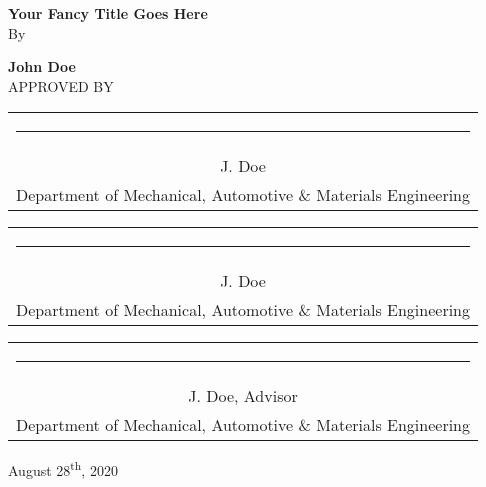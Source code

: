 \documentclass[12pt,letterpaper,oneside]{report}
\begin{document}
\newpage %
\pagestyle{empty} %
{\centering
	\vspace{4cm}
	{\large\bfseries Your Fancy Title Goes Here\\}
	\vspace{1cm}
	By\par
	\vspace{1cm}
	{\bfseries John Doe\\}
	\vfill
	APPROVED BY\\
	\vfill
	\begin{tabular}[t]{c}
           \rule{15em}{0.4pt}\\
           J. Doe\\
	Department of Mechanical, Automotive \& Materials Engineering \\
           \end{tabular}
	   
	\vspace{1.5cm}
	\begin{tabular}[t]{c}
           \rule{15em}{0.4pt}\\
           J. Doe\\
	Department of Mechanical, Automotive \& Materials Engineering \\
           \end{tabular}
	   
	\vspace{1.5cm}
	\begin{tabular}[t]{c}
           \rule{15em}{0.4pt}\\
           J. Doe, Advisor\\
	Department of Mechanical, Automotive \& Materials Engineering \\
           \end{tabular}
	\vfill
	\hfill August 28\textsuperscript{th}, 2020
}


\newpage %
\end{document}
